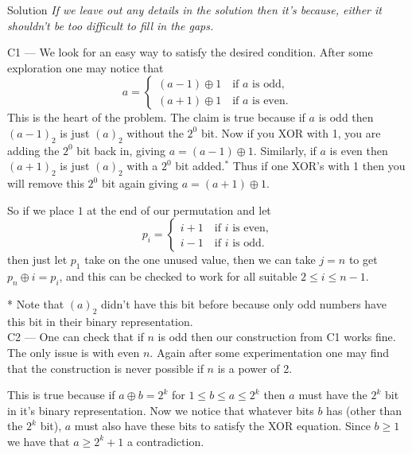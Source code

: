 \documentclass{article}
\begin{document}
\begin{solution}{Solution}
\textit{If we leave out any details in the solution then it's because,
either it shouldn't be too difficult to fill in the gaps.} \vspace{0.2cm}

C1 --- We look for an easy way to satisfy the desired condition. After some
exploration one may notice that
$$
a = \begin{cases}
(a-1) \oplus 1 \quad \text{if } a \text{ is odd,}\\
(a+1) \oplus 1 \quad \text{if } a \text{ is even.}
\end{cases}
$$
This is the heart of the problem.
The claim is true because if $a$ is odd then $(a-1)_2$ is just $(a)_2$
without the $2^0$ bit. Now if you XOR with 1, you are adding the $2^0$
bit back in, giving $a = (a-1) \oplus 1$. Similarly, if $a$ is even then
$(a+1)_2$ is just $(a)_2$ with a $2^0$ bit added.$^{*}$  Thus if one XOR's
with 1 then you will remove this $2^0$
bit again giving $a = (a+1) \oplus 1$. \vspace{0.2cm}

So if we place $1$ at the end of our permutation and let
$$
p_i = \begin{cases}
i+1 \quad \text{if } i \text{ is even,}\\
i-1 \quad \text{if } i \text{ is odd.}
\end{cases}
$$
then just let $p_1$ take on the one unused value,
then we can take $j = n$ to get $p_n \oplus i = p_i$, and this can be
checked to work for all suitable $2 \leq i \leq n-1$.
\vspace{0.2cm}

\scriptsize{* Note that $(a)_2$ didn't have
this bit before because only odd numbers have this bit in their binary
representation.}\\

\normalsize
C2 --- One can check that if $n$ is odd then our construction from C1 works
fine. The only issue is with even $n$. Again after some experimentation one
may find that the construction is never possible if $n$ is a power of 2.
\vspace{0.2cm}

This is true because if $a \oplus b = 2^k$ for $1 \leq b \leq a \leq 2^k$
then $a$ must have the $2^k$ bit in it's binary representation. Now we
notice that whatever bits $b$ has (other than the $2^k$ bit), $a$ must also
have these bits to satisfy the XOR equation. Since $b \geq 1$ we have that
$a \geq 2^k + 1$ a contradiction.\vspace{0.2cm}


\end{solution}
\end{document}
